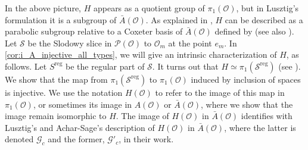 \documentclass{amsart}
\theoremstyle{definition}
\DeclareMathOperator{\regu}{reg}
\newcommand{\cP}{\mathcal{P}}
\newcommand{\cS}{\mathcal{S}}
\newcommand{\Ab}{\bar{A}}
\newcommand{\0}{\mathcal{O}}
\begin{document}
In the above picture, $H$ appears as a quotient group of $\pi_1(\0)$, but in Lusztig's formulation it is a subgroup of $\bar{A}(\0)$.  As explained in \cite{Achar-Sage-special}, $H$ can be described as a parabolic subgroup relative to a Coxeter basis of $\bar{A}(\0)$ defined by \cite{Achar-duality} (see also \cite{Achar-Sommers}). 
Let $\cS$ be the Slodowy slice in $\cP(\0)$ to $\0_m$ at the point $e_m$. In \cref{cor:i_A_injective_all_types}, 
we will give an intrinsic characterization of $H$, as follows.
Let $S^{\regu}$ be the regular part of $\cS$.  It turns out that 
$H \simeq \pi_1(\cS^{\regu})$ (see \cite{FJLS23}).
We show that the map from $\pi_1(\cS^{\regu})$ to $\pi_1(\0)$ induced by inclusion of spaces is injective.  We use the notation $H(\0)$ to refer to the image of this map in $\pi_1(\0)$, or sometimes its image in $A(\0)$ or $\bar{A}(\0)$, where we show that the image remain isomorphic to $H$. 
The image of $H(\0)$ in $\Ab(\0)$
identifies with Lusztig's and Achar-Sage's description of $H(\0)$ in $\bar{A}(\0)$, where the latter is denoted $\mathcal G_c$
and the former, $\mathcal G'_c$, in their work.
\end{document}
